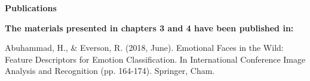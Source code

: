 


     
   \begin{center}
\vspace{5 cm}

 \textbf{Publications} 
\end{center}

\textbf{The materials presented in chapters 3 and 4 have been published in:}
\vspace{1 cm}


Abuhammad, H., \& Everson, R. (2018, June). Emotional Faces in the Wild: Feature Descriptors for Emotion Classification. In International Conference Image Analysis and Recognition (pp. 164-174). Springer, Cham.